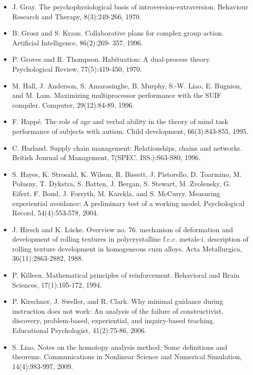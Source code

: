\documentclass[10pt,letterpaper]{article}
\begin{document}
\begin{itemize}
\item J. Gray. The psychophysiological basis of introversion-extraversion. Behaviour Research and Therapy, 8(3):249-266, 1970. %
\item B. Grosz and S. Kraus. Collaborative plans for complex group action. Artificial Intelligence, 86(2):269- 357, 1996. %
\item P. Groves and R. Thompson. Habituation: A dual-process theory. Psychological Review, 77(5):419-450, 1970. %
\item M. Hall, J. Anderson, S. Amarasinghe, B. Murphy, S.-W. Liao, E. Bugnion, and M. Lam. Maximizing multiprocessor performance with the SUIF compiler. Computer, 29(12):84-89, 1996. %
\item F. Happ\'{e}. The role of age and verbal ability in the theory of mind task performance of subjects with autism. Child development, 66(3):843-855, 1995. %
\item C. Harland. Supply chain management: Relationships, chains and networks. British Journal of Management, 7(SPEC. ISS.):S63-S80, 1996. %
\item S. Hayes, K. Strosahl, K. Wilson, R. Bissett, J. Pistorello, D. Toarmino, M. Polusny, T. Dykstra, S. Batten, J. Bergan, S. Stewart, M. Zvolensky, G. Eifert, F. Bond, J. Forsyth, M. Karekla, and S. McCurry. Measuring experiential avoidance: A preliminary test of a working model. Psychological Record, 54(4):553-578, 2004. %
\item J. Hirsch and K. L\"{u}cke. Overview no. 76. mechanism of deformation and development of rolling textures in polycrystalline f.c.c. metals-i. description of rolling texture development in homogeneous cuzn alloys. Acta Metallurgica, 36(11):2863-2882, 1988. %
\item P. Killeen. Mathematical principles of reinforcement. Behavioral and Brain Sciences, 17(1):105-172, 1994. %
\item P. Kirschner, J. Sweller, and R. Clark. Why minimal guidance during instruction does not work: An analysis of the failure of constructivist, discovery, problem-based, experiential, and inquiry-based teaching. Educational Psychologist, 41(2):75-86, 2006. %
\item S. Liao. Notes on the homotopy analysis method: Some definitions and theorems. Communications in Nonlinear Science and Numerical Simulation, 14(4):983-997, 2009. %

\end{itemize}
\end{document}
